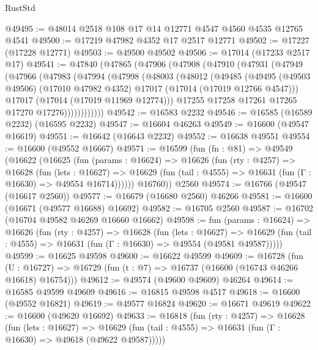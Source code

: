 \begin{lexlean}{RustStd}
\begin{coremodule}
@49495 := @48014 @2518 @108 @17 @14 @12771 @4547 @4560 @4535 @12765 @4541
@49500 := @17219 @47982 @4352 @17 @2517 @12771
@49502 := @17227 (@17228 @12771)
@49503 := @49500 @49502
@49506 := @17014 (@17233 @2517 @17)
@49541 := @47840
    (@47865
      (@47906
        (@47908
          (@47910
            (@47931
              (@47949
                (@47966
                  (@47983
                    (@47994
                      (@47998
                        (@48003
                          (@48012
                            (@49485
                              (@49495
                                (@49503 @49506)
                                (@17010 @47982 @4352)
                                @17017
                                (@17014 (@17019 @12766 @4547)))
                              @17017
                              (@17014 (@17019 @11969 @12774)))
                            @17255
                            @17258
                            @17261
                            @17265
                            @17270
                            @17276))))))))))))
@49542 := @16583 @2232
@49546 := @16585 (@16589 @2232) (@16595 @2232)
@49547 := @16604 @46263
@49549 := @16600 (@49547 @16619)
@49551 := @16642 (@16643 @2232)
@49552 := @16638 @49551
@49554 := @16600 (@49552 @16667)
@49571 := @16599
    (fun (fn : @81) =>
    @49549
      (@16622
        (@16625
          (fun (params : @16624) =>
          @16626
            (fun (rty : @4257) =>
            @16628
              (fun (lets : @16627) =>
              @16629 (fun (tail : @4555) => @16631 (fun (Γ : @16630) => @49554 @16714))))))
        @16760))
    @2560
@49574 := @16766 (@49547 (@16617 @2560))
@49577 := @16679 (@16680 @2560) @46266
@49581 := @16600 (@16671 (@49577 @16688) @16692)
@49582 := @16705 @2560
@49587 := @16702 (@16704 @49582 @46269 @16660 @16662)
@49598 := fun (params : @16624) =>
  @16626
    (fun (rty : @4257) =>
    @16628
      (fun (lets : @16627) =>
      @16629 (fun (tail : @4555) => @16631 (fun (Γ : @16630) => @49554 (@49581 @49587)))))
@49599 := @16625 @49598
@49600 := @16622 @49599
@49609 := @16728
    (fun (U : @16727) => @16729 (fun (t : @7) => @16737 (@16600 (@16743 @46266 @16618) @16754)))
@49612 := @49574 (@49600 @49609) @46264
@49614 := @16585 @49599 @49609
@49616 := @16815 @49598 @4517
@49618 := @16600 (@49552 @16821)
@49619 := @49577 @16824
@49620 := @16671 @49619
@49622 := @16600 (@49620 @16692)
@49633 := @16818
    (fun (rty : @4257) =>
    @16628
      (fun (lets : @16627) =>
      @16629 (fun (tail : @4555) => @16631 (fun (Γ : @16630) => @49618 (@49622 @49587)))))

\end{coremodule}
\end{lexlean}
